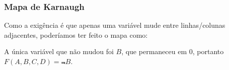 \documentclass{beamer}
\begin{document}
\begin{frame}

\vspace{-20pt}


\end{frame}

\begin{frame}
\frametitle{Mapa de Karnaugh}

Como a exigência é que apenas uma variável mude entre linhas/colunas
adjacentes, poderíamos ter feito o mapa como:

\vspace{8pt}

\hspace*{\fill}%
%
%
\hspace*{\fill}

\vspace{8pt}

\pause\pause

A única variável que não mudou foi \pause $B$, que permaneceu em $0$\pause,
portanto $F(A,B,C,D) = \Not{B}$.

\end{frame}
\end{document}
